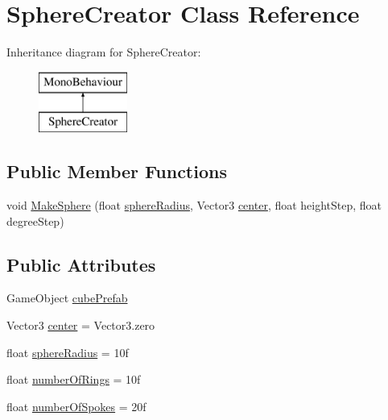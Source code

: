 \hypertarget{class_sphere_creator}{}\section{Sphere\+Creator Class Reference}
\label{class_sphere_creator}
Inheritance diagram for Sphere\+Creator\+:\begin{figure}[H]
\begin{center}
\leavevmode
\includegraphics[height=2.000000cm]{class_sphere_creator}
\end{center}
\end{figure}
\subsection*{Public Member Functions}
\begin{DoxyCompactItemize}
\item 
void \hyperlink{class_sphere_creator_af47eb147db5e77fd78c5277a2c9d1b86}{Make\+Sphere} (float \hyperlink{class_sphere_creator_ae4838acd3e643148f4d0810c399f12d0}{sphere\+Radius}, Vector3 \hyperlink{class_sphere_creator_a9cc978f732ce5f69a4a0349805502582}{center}, float height\+Step, float degree\+Step)
\end{DoxyCompactItemize}
\subsection*{Public Attributes}
\begin{DoxyCompactItemize}
\item 
Game\+Object \hyperlink{class_sphere_creator_a8710eb91a1095f6478256b8c5d76ed25}{cube\+Prefab}
\item 
Vector3 \hyperlink{class_sphere_creator_a9cc978f732ce5f69a4a0349805502582}{center} = Vector3.\+zero
\item 
float \hyperlink{class_sphere_creator_ae4838acd3e643148f4d0810c399f12d0}{sphere\+Radius} = 10f
\item 
float \hyperlink{class_sphere_creator_ac1f1879b99a5529f1d13027a8dcf858b}{number\+Of\+Rings} = 10f
\item 
float \hyperlink{class_sphere_creator_abddf892d90e8f5f7a3f2af72c4e559ee}{number\+Of\+Spokes} = 20f
\end{DoxyCompactItemize}


